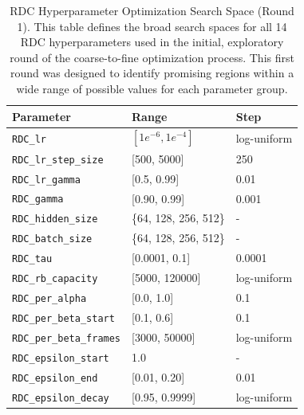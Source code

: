\begin{table}[!htb]
    \centering
    \begin{tabular}{lll}
        \toprule
        \textbf{Parameter} & \textbf{Range} & \textbf{Step} \\
        \midrule
        \texttt{RDC\_lr}                 & $[1e^{-6}, 1e^{-4}]$      & log-uniform \\
        \texttt{RDC\_lr\_step\_size}     & [500, 5000]               & 250 \\
        \texttt{RDC\_lr\_gamma}          & [0.5, 0.99]              & 0.01 \\
        \texttt{RDC\_gamma}              & [0.90, 0.99]              & 0.001\\
        \midrule
        \texttt{RDC\_hidden\_size}       & \{64, 128, 256, 512\}     & - \\
        \texttt{RDC\_batch\_size}        & \{64, 128, 256, 512\}     & - \\
        \texttt{RDC\_tau}                & [0.0001, 0.1]            & 0.0001 \\
        \midrule
        \texttt{RDC\_rb\_capacity}       & [5000, 120000]             & log-uniform \\
        \texttt{RDC\_per\_alpha}         & [0.0, 1.0]                & 0.1\\
        \texttt{RDC\_per\_beta\_start}   & [0.1, 0.6]                & 0.1\\
        \texttt{RDC\_per\_beta\_frames}  & [3000, 50000]           & log-uniform\\
        \midrule
        \texttt{RDC\_epsilon\_start}     & 1.0                       & - \\
        \texttt{RDC\_epsilon\_end}       & [0.01, 0.20]              & 0.01 \\
        \texttt{RDC\_epsilon\_decay}     & [0.95, 0.9999]            & log-uniform\\
        \midrule
    \end{tabular}
    \caption{RDC Hyperparameter Optimization Search Space (Round 1). This table defines the broad search spaces for all 14 RDC hyperparameters used in the initial, exploratory round of the coarse-to-fine optimization process. This first round was designed to identify promising regions within a wide range of possible values for each parameter group.}
    \label{tab:rdc_ho_first_round}
\end{table}

